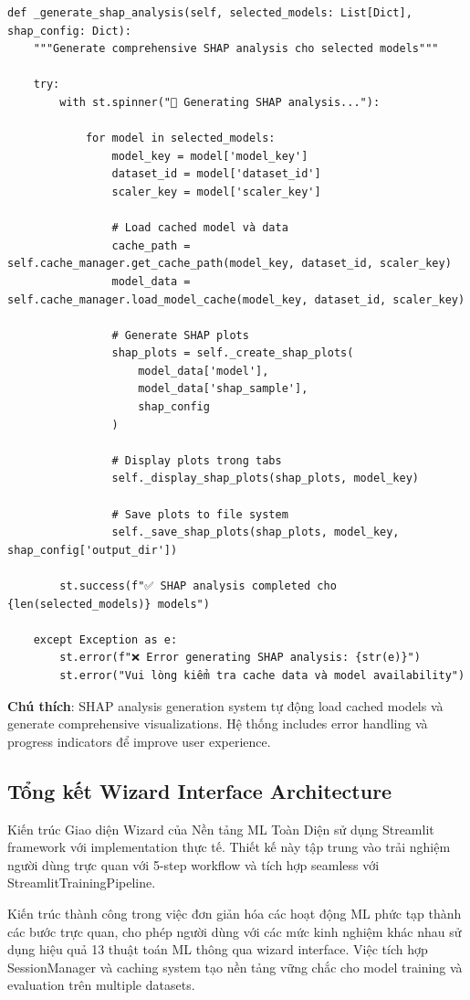 \begin{verbatim}
def _generate_shap_analysis(self, selected_models: List[Dict], shap_config: Dict):
    """Generate comprehensive SHAP analysis cho selected models"""
    
    try:
        with st.spinner("🔬 Generating SHAP analysis..."):
            
            for model in selected_models:
                model_key = model['model_key']
                dataset_id = model['dataset_id']
                scaler_key = model['scaler_key']
                
                # Load cached model và data
                cache_path = self.cache_manager.get_cache_path(model_key, dataset_id, scaler_key)
                model_data = self.cache_manager.load_model_cache(model_key, dataset_id, scaler_key)
                
                # Generate SHAP plots
                shap_plots = self._create_shap_plots(
                    model_data['model'],
                    model_data['shap_sample'],
                    shap_config
                )
                
                # Display plots trong tabs
                self._display_shap_plots(shap_plots, model_key)
                
                # Save plots to file system
                self._save_shap_plots(shap_plots, model_key, shap_config['output_dir'])
                
        st.success(f"✅ SHAP analysis completed cho {len(selected_models)} models")
        
    except Exception as e:
        st.error(f"❌ Error generating SHAP analysis: {str(e)}")
        st.error("Vui lòng kiểm tra cache data và model availability")
\end{verbatim}

\textbf{Chú thích}: SHAP analysis generation system tự động load cached models và generate comprehensive visualizations. Hệ thống includes error handling và progress indicators để improve user experience.

\subsection{Tổng kết Wizard Interface Architecture}

\noindent
Kiến trúc Giao diện Wizard của Nền tảng ML Toàn Diện sử dụng Streamlit framework với implementation thực tế. Thiết kế này tập trung vào trải nghiệm người dùng trực quan với 5-step workflow và tích hợp seamless với StreamlitTrainingPipeline.

Kiến trúc thành công trong việc đơn giản hóa các hoạt động ML phức tạp thành các bước trực quan, cho phép người dùng với các mức kinh nghiệm khác nhau sử dụng hiệu quả 13 thuật toán ML thông qua wizard interface. Việc tích hợp SessionManager và caching system tạo nền tảng vững chắc cho model training và evaluation trên multiple datasets.